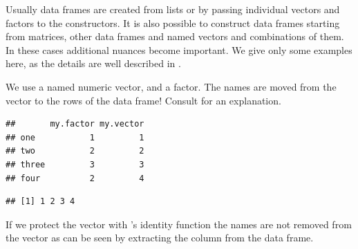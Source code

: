 \documentclass[krantz2]{krantz}\usepackage{knitr}
\begin{document}
\begin{advplayground}
Usually data frames are created from lists or by passing individual vectors and factors to the constructors. It is also possible to construct data frames starting from matrices, other data frames and named vectors and combinations of them. In these cases additional nuances become important. We give only some examples here, as the details are well described in .

We use a named numeric vector, and a factor. The names are moved from the vector to the rows of the data frame! Consult  for an explanation.

\begin{knitrout}\footnotesize
{}\color{fgcolor}\begin{kframe}
\begin{alltt}
 \hlkwb{<-} \hlstd{(} \hlstd{=} \hlstd{,}  \hlstd{=} \hlstd{,}  \hlstd{=} \hlstd{,}  \hlstd{=} \hlstd{)}
 \hlkwb{<-} \hlstd{(}\hlstd{(}\hlstd{,} \hlstd{,} \hlstd{,} \hlstd{))}
 \hlkwb{<-} 
\end{alltt}
\begin{verbatim}
##       my.factor my.vector
## one           1         1
## two           2         2
## three         3         3
## four          2         4
\end{verbatim}
\begin{alltt}
\hlopt{$}
\end{alltt}
\begin{verbatim}
## [1] 1 2 3 4
\end{verbatim}
\end{kframe}
\end{knitrout}

If we protect the vector with \Rlang's identity function  the names are not removed from the vector as can be seen by extracting the column from the data frame.


\end{advplayground}
\end{document}
